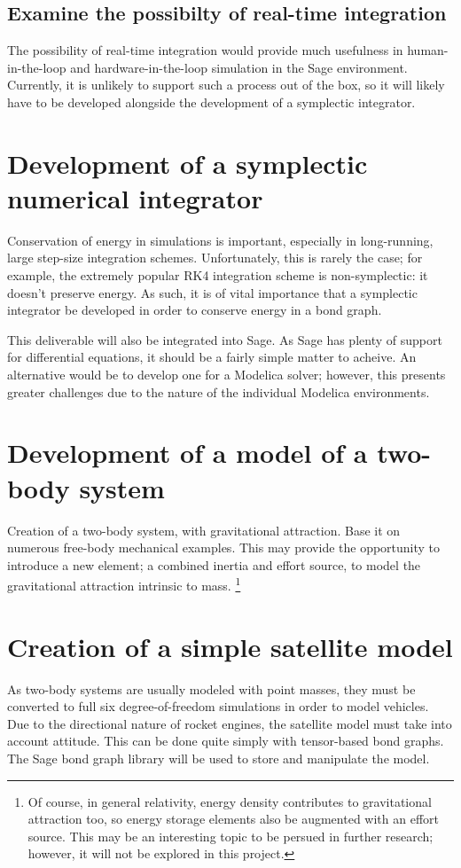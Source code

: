 \documentclass[utf,a4paper,12pt]{report}
\begin{document}
\subsection{Examine the possibilty of real-time integration}
The possibility of real-time integration would provide much usefulness in human-in-the-loop and hardware-in-the-loop simulation in the Sage environment. Currently, it is unlikely to support such a process out of the box, so it will likely have to be developed alongside the development of a symplectic integrator.

\section{Development of a symplectic numerical integrator}
Conservation of energy in simulations is important, especially in long-running, large step-size integration schemes. Unfortunately, this is rarely the case; for example, the extremely popular RK4 integration scheme is non-symplectic: it doesn't preserve energy. As such, it is of vital importance that a symplectic integrator be developed in order to conserve energy in a bond graph.

This deliverable will also be integrated into Sage. As Sage has plenty of support for differential equations, it should be a fairly simple matter to acheive. An alternative would be to develop one for a Modelica solver; however, this presents greater challenges due to the nature of the individual Modelica environments.

\section{Development of a model of a two-body system}
Creation of a two-body system, with gravitational attraction. Base it on numerous free-body mechanical examples. This may provide the opportunity to introduce a new element; a combined inertia and effort source, to model the gravitational attraction intrinsic to mass. \footnote{Of course, in general relativity, energy density contributes to gravitational attraction too, so energy storage elements also be augmented with an effort source. This may be an interesting topic to be persued in further research; however, it will not be explored in this project.} 

\section{Creation of a simple satellite model}
As two-body systems are usually modeled with point masses, they must be converted to full six degree-of-freedom simulations in order to model vehicles. Due to the directional nature of rocket engines, the satellite model must take into account attitude. This can be done quite simply with tensor-based bond graphs. The Sage bond graph library will be used to store and manipulate the model.
\end{document}
